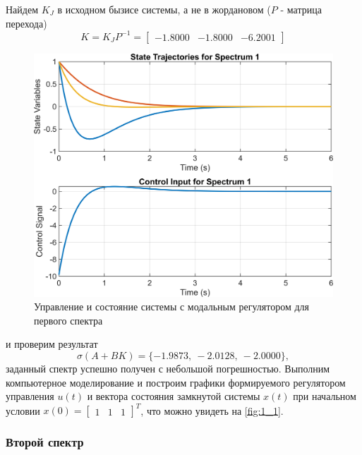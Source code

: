 \noindent Найдем $K_J$ в исходном бызисе
системы, а не в жордановом ($P$ - матрица перехода)
\begin{equation*}
    K=K_JP^{-1}=\begin{bmatrix}
        -1.8000	&-1.8000	&-6.2001
    \end{bmatrix}
\end{equation*}

\begin{figure}[H]
    \centering
    \includegraphics[width=0.9\linewidth]{figs/task1_1.png}
    \caption{Управление и состояние системы с модальным регулятором для первого спектра}
    \label{fig:1_1}
\end{figure}

\noindent и проверим результат
\begin{equation*}
    \sigma(A+BK)=\{-1.9873,\ 
    -2.0128,\ 
    -2.0000\},
\end{equation*}
заданный спектр успешно получен с небольшой погрешностью. 
Выполним компьютерное моделирование и построим графики 
формируемого регулятором управления $u(t)$ и вектора 
состояния замкнутой системы $x(t)$ при начальном условии 
$x(0) =\begin{bmatrix}
    1 & 1 & 1
\end{bmatrix}^T$, что можно увидеть на \autoref{fig:1_1}.

\subsubsection{Второй спектр}

